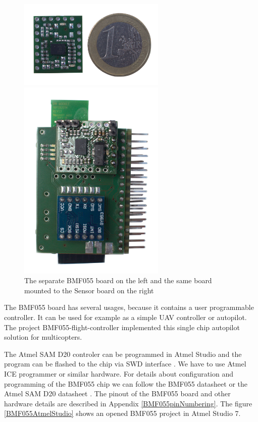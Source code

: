 \begin{figure}
	\centering
	\label{BMF055photo}
	\caption{The separate BMF055 board on the left and the same board mounted to the Sensor board on the right}
	\begin{minipage}[c]{.45\textwidth}
		\includegraphics[width=7cm]{img/BMF055.jpg}
	\end{minipage}
	\vrule{}
	\begin{minipage}[c]{.45\textwidth}
		\includegraphics[width=7cm]{img/HWassembledNoCoin.jpg}
	\end{minipage}
\end{figure}

The BMF055 board has several usages, because it contains a user programmable controller. It can be used for example as a simple UAV controller or autopilot. The project BMF055-flight-controller \cite{BMF055flightController} implemented this single chip autopilot solution for multicopters.

The Atmel SAM D20 controler \cite{atmel:samd20} can be programmed in Atmel Studio \cite{AtmelStudio} and the program can be flashed to the chip via SWD interface \cite{SWDinterface}. We have to use Atmel ICE programmer \cite{AtmelICE} or similar hardware. For details about configuration and programming of the BMF055 chip we can follow the BMF055 datasheet \cite{bosch:BMF055} or the Atmel SAM D20 datasheet \cite{atmel:samd20}. The pinout of the BMF055 board and other hardware details are described in Appendix \ref{BMF055pinNumbering}. The figure \ref{BMF055AtmelStudio} shows an opened BMF055 project in Atmel Studio 7.

